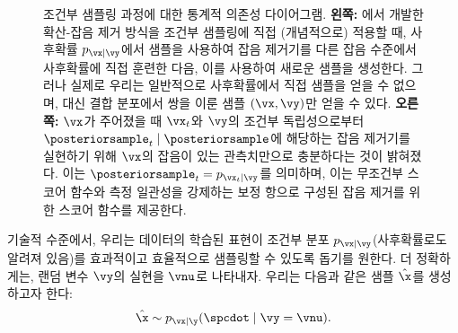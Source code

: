 \documentclass[../../book-main_ko.tex]{subfiles}
\begin{document}
\begin{figure}[t]
  \centering
  \begin{subfigure}{0.45\textwidth}
    \vspace{0.75cm}
    \centering
    \vspace{0.75cm}
    \caption{}
    \label{fig:left}
  \end{subfigure}
  \hfill
  \begin{subfigure}{0.45\textwidth}
    \centering
    \caption{}
    \label{fig:right}
  \end{subfigure}
  \caption{조건부 샘플링 과정에 대한 통계적 의존성 다이어그램.
  \textbf{왼쪽:} 에서 개발한 확산-잡음 제거 방식을 조건부 샘플링에 직접 (개념적으로) 적용할 때, 사후확률 $p_{\vx \mid \vy}$에서 샘플을 사용하여 잡음 제거기를 다른 잡음 수준에서 사후확률에 직접 훈련한 다음, 이를 사용하여 새로운 샘플을 생성한다. 그러나 실제로 우리는 일반적으로 사후확률에서 직접 샘플을 얻을 수 없으며, 대신 결합 분포에서 쌍을 이룬 샘플 $(\vx, \vy)$만 얻을 수 있다.
  \textbf{오른쪽:} $\vx$가 주어졌을 때 $\vx_t$와 $\vy$의 조건부 독립성으로부터 $\posteriorsample_t \mid \posteriorsample$에 해당하는 잡음 제거기를 실현하기 위해 $\vx$의 잡음이 있는 관측치만으로 충분하다는 것이 밝혀졌다. 이는 $\posteriorsample_t = p_{\vx_t \mid \vy}$를 의미하며, 이는 무조건부 스코어 함수와 측정 일관성을 강제하는 보정 항으로 구성된 잡음 제거를 위한 스코어 함수를 제공한다.}
  \label{fig:posterior-sampling-cds}
\end{figure}


기술적 수준에서, 우리는 데이터의 학습된 표현이 조건부 분포 $p_{\vx\mid \vy}$(사후확률로도 알려져 있음)를 효과적이고 효율적으로 샘플링할 수 있도록 돕기를 원한다. 더 정확하게는, 랜덤 변수 $\vy$의 실현을 $\vnu$로 나타내자.
우리는 다음과 같은 샘플 $\hat{\x}$를 생성하고자 한다:
\begin{equation}\label{eq:goal-sample-posterior}
  \hat{\x} \sim   p_{\vx \mid \y}(\spcdot \mid \vy=\vnu).
\end{equation}
\end{document}
